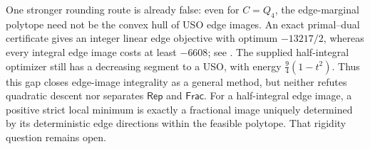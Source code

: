 \documentclass[11pt]{article}
\theoremstyle{definition}
\newcommand{\Rep}{\mathsf{Rep}}
\newcommand{\Frac}{\mathsf{Frac}}
\begin{document}
One stronger rounding route is already false: even for $C=Q_4$, the
edge-marginal polytope need not be the convex hull of USO edge images.
An exact primal--dual certificate gives an integer linear edge objective
with optimum $-13217/2$, whereas every integral edge image costs at least
$-6608$; see \cite[Proposition~\textnormal{The edge-marginal polytope need
not be integral}]{AlgebraicAmple}. The supplied half-integral optimizer
still has a decreasing segment to a USO, with energy $\frac94(1-t^2)$.
Thus this gap closes edge-image integrality as a general method, but
neither refutes quadratic descent nor separates $\Rep$ and $\Frac$.
For a half-integral edge image, a positive strict local minimum is
exactly a fractional image uniquely determined by its deterministic
edge directions within the feasible polytope. That rigidity question
remains open.
\end{document}

